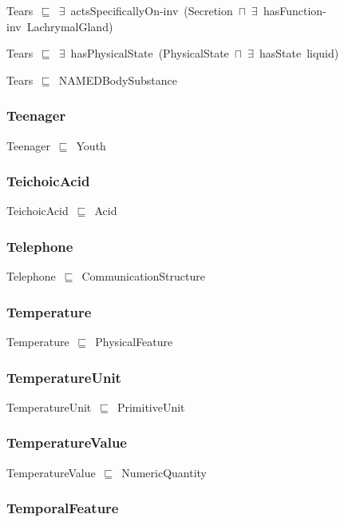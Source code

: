 \documentclass{article}
\begin{document}
Tears~\ensuremath{\sqsubseteq}~\ensuremath{\exists}~actsSpecificallyOn-inv~(Secretion~\ensuremath{\sqcap}~\ensuremath{\exists}~hasFunction-inv~LachrymalGland)~

Tears~\ensuremath{\sqsubseteq}~\ensuremath{\exists}~hasPhysicalState~(PhysicalState~\ensuremath{\sqcap}~\ensuremath{\exists}~hasState~liquid)~

Tears~\ensuremath{\sqsubseteq}~NAMEDBodySubstance~

\subsubsection*{Teenager}

Teenager~\ensuremath{\sqsubseteq}~Youth~

\subsubsection*{TeichoicAcid}

TeichoicAcid~\ensuremath{\sqsubseteq}~Acid~

\subsubsection*{Telephone}

Telephone~\ensuremath{\sqsubseteq}~CommunicationStructure~

\subsubsection*{Temperature}

Temperature~\ensuremath{\sqsubseteq}~PhysicalFeature~

\subsubsection*{TemperatureUnit}

TemperatureUnit~\ensuremath{\sqsubseteq}~PrimitiveUnit~

\subsubsection*{TemperatureValue}

TemperatureValue~\ensuremath{\sqsubseteq}~NumericQuantity~

\subsubsection*{TemporalFeature}
\end{document}
